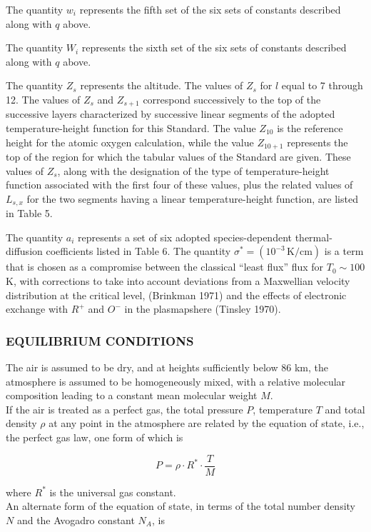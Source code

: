 \documentclass{article}
\begin{document}
The quantity \(w_i\) represents the fifth set of the six sets of constants described along with \(q\) above.

The quantity \(W_i\) represents the sixth set of the six sets of constants described along with \(q\) above.

The quantity \(Z_s\) represents the altitude. The values of \(Z_s\) for \(l\) equal to 7 through 12. The values of \(Z_s\) and \(Z_{s+1}\) correspond successively to the top of the successive layers characterized by successive linear segments of the adopted temperature-height function for this Standard. The value \(Z_{10}\) is the reference height for the atomic oxygen calculation, while the value \(Z_{10+1}\) represents the top of the region for which the tabular values of the Standard are given. These values of \(Z_s\), along with the designation of the type of temperature-height function associated with the first four of these values, plus the related values of \(L_{s,x}\) for the two segments having a linear temperature-height function, are listed in Table 5.

The quantity \(a_i\) represents a set of six adopted species-dependent thermal-diffusion coefficients listed in Table 6. The quantity \(\sigma^* = (10^{-3}\, \mathrm{K/cm})\) is a term that is chosen as a compromise between the classical “least flux” flux for \(T_{0} \sim 100\) K, with corrections to take into account deviations from a Maxwellian velocity distribution at the critical level, (Brinkman 1971) and the effects of electronic exchange with \(R^+\) and \(O^-\) in the plasmapshere (Tinsley 1970).

\subsubsection{EQUILIBRIUM CONDITIONS} 
The air is assumed to be dry, and at heights sufficiently below 86 km, the atmosphere is assumed to be homogeneously mixed, with a relative molecular composition leading to a constant mean molecular weight \(M\). \\
If the air is treated as a perfect gas, the total pressure \(P\), temperature \(T\) and total density \(\rho\) at any point in the atmosphere are related by the equation of state, i.e., the perfect gas law, one form of which is

\begin{equation}
    P = \rho \cdot R^* \cdot \frac{T}{M} \tag{1}
\end{equation}

where \(R^*\) is the universal gas constant. \\
An alternate form of the equation of state, in terms of the total number density \(N\) and the Avogadro constant \(N_A\), is
\end{document}
